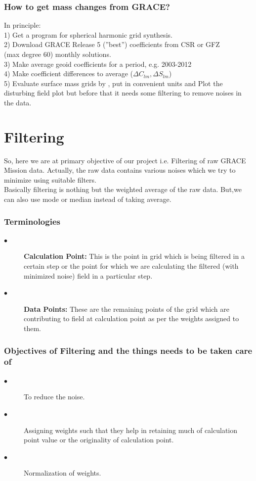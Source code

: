 \documentclass[a4paper,12pt]{report}
\begin{document}
\subsection{How  to get mass changes from GRACE?}
In principle:\\
1) Get a program for spherical harmonic grid synthesis.\\
2) Download GRACE Release 5 (”best”) coefficients from CSR or GFZ \\(max degree 60) monthly solutions.\\
3) Make average geoid coefficients for a period, e.g. 2003-2012\\
4) Make coefficient differences to average ($\Delta C_{lm}, \Delta S_{lm}$)\\
5) Evaluate surface mass grids by , put in convenient units and Plot the disturbing field plot but before that it needs some filtering to remove noises in the data. \\


\chapter{Filtering}
So, here we are at primary objective of our project i.e. Filtering of raw GRACE Mission data. Actually, the raw data contains various noises which we try to minimize using suitable filters.
\\
Basically filtering is nothing but the weighted average of the raw data. But,we can also use mode or median instead of taking average. 

\subsection{Terminologies} 
	\begin{description}
	\item[$\bullet$]\textbf{Calculation Point: }This is the point in grid which is being filtered in a certain step or the point for which we are calculating the filtered (with minimized noise) field in a particular step.\\ 
	\item[$\bullet$]\textbf{Data Points: }These are the remaining points of the grid which are contributing to field at calculation point as per the weights assigned to them.
	\end{description}  

\subsection{Objectives of Filtering and the things needs to be taken care of} 
	\begin{description}
	\item[$\bullet$]To reduce the noise.
	\item[$\bullet$]Assigning weights such that they help in 		retaining much of calculation point value or the 				originality of calculation point.
	\item[$\bullet$]Normalization of weights.
	\end{description}  
 
\end{document}
